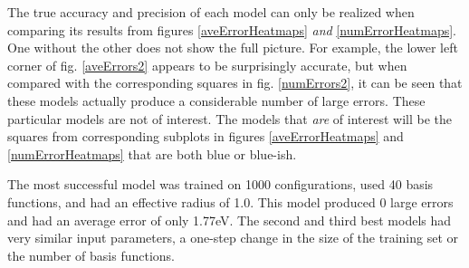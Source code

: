 \par The true accuracy and precision of each model can only be realized when comparing its results from figures \ref{aveErrorHeatmaps} \textit{and} \ref{numErrorHeatmaps}. One without the other does not show the full picture. For example, the lower left corner of fig. \ref{aveErrors2} appears to be surprisingly accurate, but when compared with the corresponding squares in fig. \ref{numErrors2}, it can be seen that these models actually produce a considerable number of large errors. These particular models are not of interest. The models that \textit{are} of interest will be the squares from corresponding subplots in figures \ref{aveErrorHeatmaps} and \ref{numErrorHeatmaps} that are both blue or blue-ish. 
\par The most successful model was trained on 1000 configurations, used 40 basis functions, and had an effective radius of 1.0. This model produced 0 large errors and had an average error of only 1.77eV. The second and third best models had very similar input parameters, a one-step change in the size of the training set or the number of basis functions.
